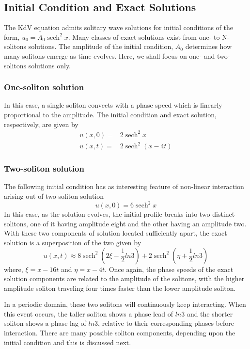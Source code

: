 \documentclass{svjour3}                    %
\DeclareMathOperator{\sech}{sech}
\begin{document}
\subsection{Initial Condition and Exact Solutions}
\label{subsec:init}
The KdV equation admits solitary wave solutions for initial conditions of the form, $u_0 = A_0 \sech^2x$. Many classes of exact solutions exist from 
one- to N-solitons solutions. The amplitude of the initial condition, $A_0$ determines how many solitons emerge as time evolves. Here, we shall focus 
on one- and two-solitons solutions only.

\subsubsection{One-soliton solution} In this case, a single soliton convects with a phase speed which is linearly proportional to the amplitude. The initial condition and exact solution, respectively, are given by
\begin{align}
\label{eq:1solin}
u(x,0) = &2 \sech^2 x\\
\label{eq:1solex}
u(x,t) = &2 \sech^2(x-4t)
\end{align}

\subsubsection{Two-soliton solution} The following initial condition has as interesting feature of non-linear interaction arising out of two-soliton solution
\begin{equation}
\label{eq:2solin}
u(x,0) = 6 \sech^2 x
\end{equation}
In this case, as the solution evolves, the initial profile breaks into two distinct solitons, one of it having amplitude eight and the other having an amplitude two. With these two components of solution located sufficiently apart, the exact solution is a superposition of the two given by  
\begin{equation}
\label{eq:2solex}
u(x,t) \approx  8 \sech^2 \left(2\xi - \frac{1}{2} ln 3\right) + 2 \sech^2 \left(\eta + \frac{1}{2} ln 3\right)
\end{equation}
where, $\xi =x-16t$ and $\eta=x-4t$. Once again, the phase speeds of the exact solution components are related to the amplitude of the solitons, with the higher amplitude soliton traveling four times faster than the lower amplitude soliton.

In a periodic domain, these two solitons will continuously keep interacting. When this event occurs, the taller soliton shows a phase lead of $ln 3$ and the shorter soliton shows a phase lag of $ln 3$, relative to their corresponding phases before interaction. There are many possible soliton components, depending upon the initial condition and this is discussed next.
\end{document}
